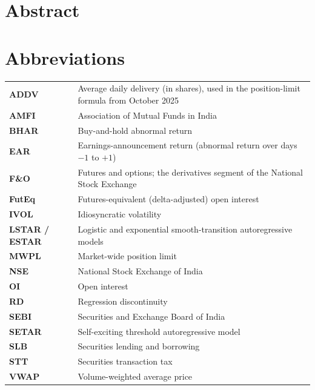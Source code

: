 \chapter*{Abstract}
\thispagestyle{plain}


\cleardoublepage
\pagestyle{body}
\tableofcontents
\listoffigures
\listoftables

\chapter*{Abbreviations}
\thispagestyle{plain}
{\renewcommand{\arraystretch}{1.15}
\begin{tabularx}{\linewidth}{@{}>{\leavevmode\bfseries\color{accent}}p{2.9cm}L@{}}
ADDV & Average daily delivery (in shares), used in the position-limit formula from October 2025 \\
AMFI & Association of Mutual Funds in India \\
BHAR & Buy-and-hold abnormal return \\
EAR & Earnings-announcement return (abnormal return over days $-1$ to $+1$) \\
F\&O & Futures and options; the derivatives segment of the National Stock Exchange \\
FutEq & Futures-equivalent (delta-adjusted) open interest \\
IVOL & Idiosyncratic volatility \\
LSTAR / ESTAR & Logistic and exponential smooth-transition autoregressive models \\
MWPL & Market-wide position limit \\
NSE & National Stock Exchange of India \\
OI & Open interest \\
RD & Regression discontinuity \\
SEBI & Securities and Exchange Board of India \\
SETAR & Self-exciting threshold autoregressive model \\
SLB & Securities lending and borrowing \\
STT & Securities transaction tax \\
VWAP & Volume-weighted average price \\
\end{tabularx}}

